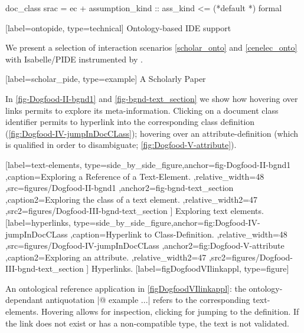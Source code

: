\begin{isabellebody}
\begin{isamarkuptext}
\begin{isar}
doc_class srac = ec  +
     assumption_kind :: ass_kind <= (*default *) formal
\end{isar}%
\end{isamarkuptext}\isamarkuptrue%
%
\isaDofSectionTechnical%
%
[label={ontopide}, type={technical}]%
{Ontology-based IDE support}%
%
\begin{isamarkuptext}%
We present a selection of interaction scenarios  \autoref{scholar_onto} 
and \autoref{cenelec_onto} with Isabelle/PIDE instrumented by \isadof.%
\end{isamarkuptext}\isamarkuptrue%
%
\isaDofSubsectionExample%
%
[label={scholar_pide}, type={example}]%
{A Scholarly Paper}%
%
\begin{isamarkuptext}%
In \autoref{fig-Dogfood-II-bgnd1} and \autoref{fig-bgnd-text_section} we show how
hovering over links permits to explore its meta-information. 
Clicking on a document class identifier permits to hyperlink into the corresponding
class definition (\autoref{fig:Dogfood-IV-jumpInDocCLass}); hovering over an attribute-definition
(which is qualified in order to disambiguate; \autoref{fig:Dogfood-V-attribute}).%
\end{isamarkuptext}\isamarkuptrue%
%
\isaDofSideBySideFigure%
%
[label={{text-elements}}, type={side_by_side_figure},anchor={fig-Dogfood-II-bgnd1}
 ,caption={Exploring a Reference of a Text-Element.}
 ,relative_width={48}
 ,src={figures/Dogfood-II-bgnd1}
 ,anchor2={fig-bgnd-text_section}
 ,caption2={Exploring the class of a text element.}
 ,relative_width2={47}
 ,src2={figures/Dogfood-III-bgnd-text_section} 
]%
{Exploring text elements.}%
%
\isaDofSideBySideFigure%
%
[label={{hyperlinks}}, type={side_by_side_figure},anchor={fig:Dogfood-IV-jumpInDocCLass}
 ,caption={Hyperlink to Class-Definition.}
 ,relative_width={48}
 ,src={figures/Dogfood-IV-jumpInDocCLass}
 ,anchor2={fig:Dogfood-V-attribute}
 ,caption2={Exploring an attribute.}
 ,relative_width2={47}
 ,src2={figures/Dogfood-III-bgnd-text_section} 
]%
{Hyperlinks.}%
%
\isaDofDeclareReferenceFigure%
%
[label={{figDogfoodVIlinkappl}}, type={figure}]%
%
\begin{isamarkuptext}%
An ontological reference application in 
\autoref{figDogfoodVIlinkappl}: the
ontology-dependant antiquotation \inlineisar|@ {example ...}| refers to the corresponding 
text-elements. Hovering allows for inspection, clicking for jumping to the definition. 
If the link does not exist or has a non-compatible type, the text is not validated.%
\end{isamarkuptext}\isamarkuptrue%
%
%
\isaDofFigure%

\end{isabellebody}
